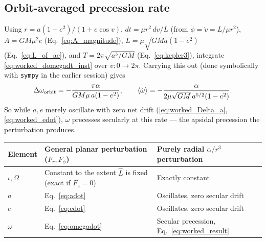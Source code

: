 \documentclass[11pt]{article}
\begin{document}
\subsection{Orbit-averaged precession rate}

Using $r=a(1-e^2)/(1+e\cos v)$, $dt = \mu r^2\,dv/L$ (from $\dot\phi=\dot v=L/\mu r^2$), $A=GM\mu^2e$ (Eq.~\ref{eq:A_magnitude}), $L=\mu\sqrt{GMa(1-e^2)}$ (Eq.~\ref{eq:L_of_ae}), and $T=2\pi\sqrt{a^3/GM}$ (Eq.~\ref{eq:kepler3}), integrate \eqref{eq:worked_domegadt_inst} over $v:0\to2\pi$. Carrying this out (done symbolically with \texttt{sympy} in the earlier session) gives
\begin{equation}
\Delta\omega_{\rm orbit} = -\frac{\pi\alpha}{GM\mu\,a(1-e^2)}, \qquad
\left\langle\dot\omega\right\rangle = -\frac{\alpha}{2\mu\sqrt{GM}\,a^{5/2}(1-e^2)}. \label{eq:worked_result}
\end{equation}
So while $a,e$ merely oscillate with zero net drift (\ref{eq:worked_Delta_a}, \ref{eq:worked_edot}), $\omega$ precesses secularly at this rate — the apsidal precession the perturbation produces. 

\begin{center}
\begin{tabular}{@{}lll@{}}
\toprule
Element & General planar perturbation ($F_r,F_\phi$) & Purely radial $\alpha/r^3$ perturbation\\
\midrule
$\iota,\Omega$ & Constant to the extent $\hat L$ is fixed (exact if $F_z=0$) & Exactly constant \\
$a$ & Eq.~\eqref{eq:adot} & Oscillates, zero secular drift \\
$e$ & Eq.~\eqref{eq:edot} & Oscillates, zero secular drift \\
$\omega$ & Eq.~\eqref{eq:omegadot} & Secular precession, Eq.~\eqref{eq:worked_result} \\
\bottomrule
\end{tabular}
\end{center}
\end{document}
